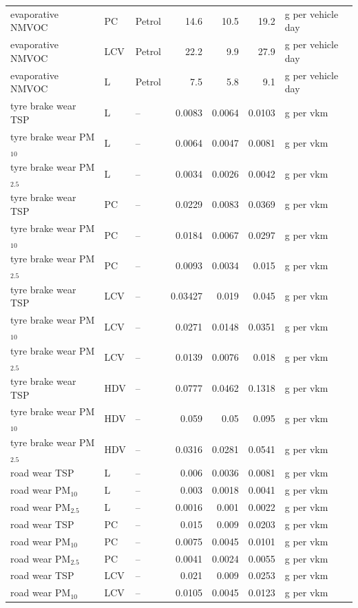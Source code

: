 \begin{table}[!htbp]
\begin{tabular}{@{}lllrrrl@{}}
evaporative NMVOC & PC & Petrol & 14.6 & 10.5 & 19.2 & g per vehicle day \\
evaporative NMVOC & LCV & Petrol & 22.2 & 9.9 & 27.9 & g per vehicle day \\
evaporative NMVOC & L & Petrol & 7.5 & 5.8 & 9.1 & g per vehicle day \\
tyre brake wear TSP & L & -- & 0.0083 & 0.0064 & 0.0103 & g per vkm \\
tyre brake wear PM$_{10}$ & L & -- & 0.0064 & 0.0047 & 0.0081 & g per vkm \\
tyre brake wear PM$_{2.5}$ & L & -- & 0.0034 & 0.0026 & 0.0042 & g per vkm \\
tyre brake wear TSP & PC & -- & 0.0229 & 0.0083 & 0.0369 & g per vkm \\
tyre brake wear PM$_{10}$ & PC & -- & 0.0184 & 0.0067 & 0.0297 & g per vkm \\
tyre brake wear PM$_{2.5}$ & PC & -- & 0.0093 & 0.0034 & 0.015 & g per vkm \\
tyre brake wear TSP & LCV & -- & 0.03427 & 0.019 & 0.045 & g per vkm \\
tyre brake wear PM$_{10}$ & LCV & -- & 0.0271 & 0.0148 & 0.0351 & g per vkm \\
tyre brake wear PM$_{2.5}$ & LCV & -- & 0.0139 & 0.0076 & 0.018 & g per vkm \\
tyre brake wear TSP & HDV & -- & 0.0777 & 0.0462 & 0.1318 & g per vkm \\
tyre brake wear PM$_{10}$ & HDV & -- & 0.059 & 0.05 & 0.095 & g per vkm \\
tyre brake wear PM$_{2.5}$ & HDV & -- & 0.0316 & 0.0281 & 0.0541 & g per vkm \\
road wear TSP & L & -- & 0.006 & 0.0036 & 0.0081 & g per vkm \\
road wear PM$_{10}$ & L & -- & 0.003 & 0.0018 & 0.0041 & g per vkm \\
road wear PM$_{2.5}$ & L & -- & 0.0016 & 0.001 & 0.0022 & g per vkm \\
road wear TSP & PC & -- & 0.015 & 0.009 & 0.0203 & g per vkm \\
road wear PM$_{10}$ & PC & -- & 0.0075 & 0.0045 & 0.0101 & g per vkm \\
road wear PM$_{2.5}$ & PC & -- & 0.0041 & 0.0024 & 0.0055 & g per vkm \\
road wear TSP & LCV & -- & 0.021 & 0.009 & 0.0253 & g per vkm \\
road wear PM$_{10}$ & LCV & -- & 0.0105 & 0.0045 & 0.0123 & g per vkm \\

\end{tabular}
\end{table}
